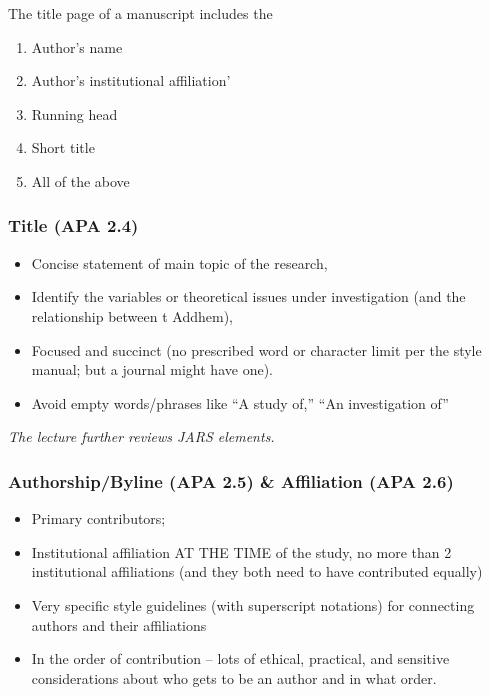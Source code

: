\documentclass[
  english,
]{book}
\providecommand{\tightlist}{%
  \setlength{\itemsep}{0pt}\setlength{\parskip}{0pt}}
\begin{document}
The title page of a manuscript includes the

\begin{enumerate}
\def\labelenumi{\alph{enumi}.}
\tightlist
\item
  Author's name
\item
  Author's institutional affiliation'
\item
  Running head
\item
  Short title
\item
  All of the above
\end{enumerate}

\hypertarget{title-apa-2.4}{%
\subsubsection{Title (APA 2.4)}\label{title-apa-2.4}}

\begin{itemize}
\tightlist
\item
  Concise statement of main topic of the research,
\item
  Identify the variables or theoretical issues under investigation (and the relationship between t Addhem),
\item
  Focused and succinct (no prescribed word or character limit per the style manual; but a journal might have one).
\item
  Avoid empty words/phrases like ``A study of,'' ``An investigation of''
\end{itemize}

\emph{The lecture further reviews JARS elements.}

\hypertarget{authorshipbyline-apa-2.5-affiliation-apa-2.6}{%
\subsubsection{Authorship/Byline (APA 2.5) \& Affiliation (APA 2.6)}\label{authorshipbyline-apa-2.5-affiliation-apa-2.6}}

\begin{itemize}
\tightlist
\item
  Primary contributors;
\item
  Institutional affiliation AT THE TIME of the study, no more than 2 institutional affiliations (and they both need to have contributed equally)
\item
  Very specific style guidelines (with superscript notations) for connecting authors and their affiliations
\item
  In the order of contribution -- lots of ethical, practical, and sensitive considerations about who gets to be an author and in what order.
\end{itemize}
\end{document}
